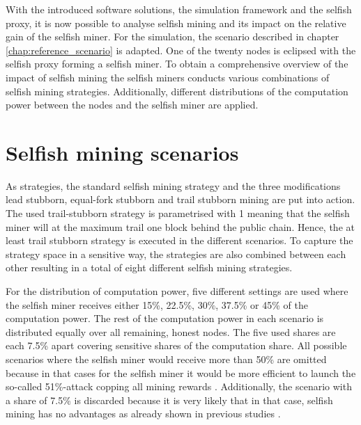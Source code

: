 With the introduced software solutions, the simulation framework and the selfish proxy, it is now possible to analyse selfish mining and its impact on the relative gain of the selfish miner.
For the simulation, the scenario described in chapter \ref{chap:reference_scenario} is adapted.
One of the twenty nodes is eclipsed with the selfish proxy forming a selfish miner.
To obtain a comprehensive overview of the impact of selfish mining the selfish miners conducts various combinations of selfish mining strategies.
Additionally, different distributions of the computation power between the nodes and the selfish miner are applied.

\section{Selfish mining scenarios}

As strategies, the standard selfish mining strategy and the three modifications lead stubborn, equal-fork stubborn and trail stubborn mining are put into action.
The used trail-stubborn strategy is parametrised with 1 meaning that the selfish miner will at the maximum trail one block behind the public chain.
Hence, the at least trail stubborn strategy is executed in the different scenarios.
To capture the strategy space in a sensitive way, the strategies are also combined between each other resulting in a total of eight different selfish mining strategies.

For the distribution of computation power, five different settings are used where the selfish miner receives either 15\%, 22.5\%, 30\%, 37.5\% or 45\% of the computation power.
The rest of the computation power in each scenario is distributed equally over all remaining, honest nodes.
The five used shares are each 7.5\% apart covering sensitive shares of the computation share.
All possible scenarios where the selfish miner would receive more than 50\% are omitted because in that cases for the selfish miner it would be more efficient to launch the so-called 51\%-attack copping all mining rewards \cite{nakamoto2008bitcoin, clarkresearch, tschorsch2016bitcoin}.
Additionally, the scenario with a share of 7.5\% is discarded because it is very likely that in that case, selfish mining has no advantages as already shown in previous studies \cite{eyal2014majority, sapirshtein2016optimal, nayak2016stubborn}.

